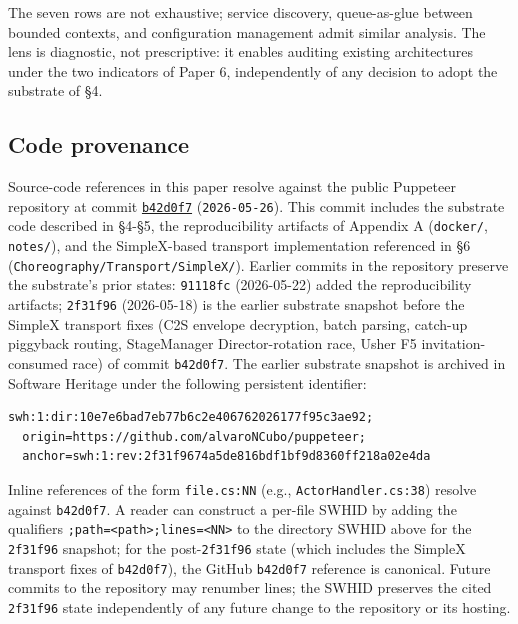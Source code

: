 \documentclass[
]{article}
\begin{document}
The seven rows are not exhaustive; service discovery, queue-as-glue
between bounded contexts, and configuration management admit similar
analysis. The lens is diagnostic, not prescriptive: it enables auditing
existing architectures under the two indicators of Paper 6,
independently of any decision to adopt the substrate of §4.

\subsection{Code provenance}\label{code-provenance}

Source-code references in this paper resolve against the public
Puppeteer repository at commit
\href{https://github.com/alvaroNCubo/puppeteer/tree/b42d0f7}{\texttt{b42d0f7}}
(\texttt{2026-05-26}). This commit includes the substrate code described
in §4-§5, the reproducibility artifacts of Appendix A (\texttt{docker/},
\texttt{notes/}), and the SimpleX-based transport implementation
referenced in §6 (\texttt{Choreography/Transport/SimpleX/}). Earlier
commits in the repository preserve the substrate's prior states:
\texttt{91118fc} (2026-05-22) added the reproducibility artifacts;
\texttt{2f31f96} (2026-05-18) is the earlier substrate snapshot before
the SimpleX transport fixes (C2S envelope decryption, batch parsing,
catch-up piggyback routing, StageManager Director-rotation race, Usher
F5 invitation-consumed race) of commit \texttt{b42d0f7}. The earlier
substrate snapshot is archived in Software Heritage under the following
persistent identifier:

\begin{verbatim}
swh:1:dir:10e7e6bad7eb77b6c2e406762026177f95c3ae92;
  origin=https://github.com/alvaroNCubo/puppeteer;
  anchor=swh:1:rev:2f31f9674a5de816bdf1bf9d8360ff218a02e4da
\end{verbatim}

Inline references of the form \texttt{file.cs:NN} (e.g.,
\texttt{ActorHandler.cs:38}) resolve against \texttt{b42d0f7}. A reader
can construct a per-file SWHID by adding the qualifiers
\texttt{;path=\textless{}path\textgreater{};lines=\textless{}NN\textgreater{}}
to the directory SWHID above for the \texttt{2f31f96} snapshot; for the
post-\texttt{2f31f96} state (which includes the SimpleX transport fixes
of \texttt{b42d0f7}), the GitHub \texttt{b42d0f7} reference is
canonical. Future commits to the repository may renumber lines; the
SWHID preserves the cited \texttt{2f31f96} state independently of any
future change to the repository or its hosting.
\end{document}
